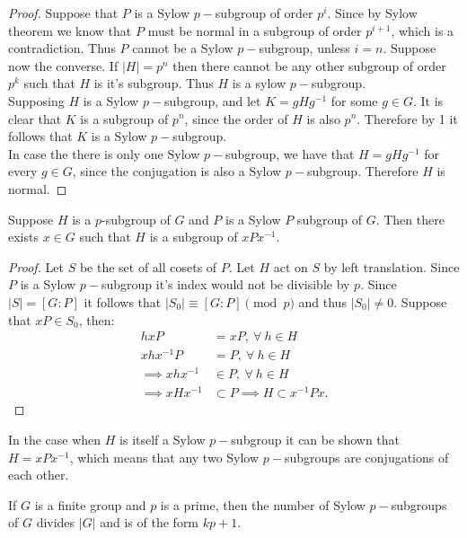 \begin{proof}
  Suppose that $P$ is a Sylow $p-$subgroup of order $p^i$. Since by Sylow theorem we know that $P$ must be normal in a subgroup of order $p^{i+1}$, which is a contradiction. Thus $P$ cannot be a Sylow $p-$subgroup, unless $i=n$. Suppose now the converse. If $|H| = p^n$ then there cannot be any other subgroup of order $p^k$ such that $H$ is it's subgroup. Thus $H$ is a sylow $p-$subgroup.\\

  Supposing $H$ is a Sylow $p-$subgroup, and let $K = gHg^{-1}$ for some $g\in G$. It is clear that $K$ is a subgroup of $p^n$, since the order of $H$ is also $p^n$. Therefore by 1 it follows that $K$ is a Sylow $p-$subgroup.\\

  In case the there is only one Sylow $p-$subgroup, we have that $H = gHg^{-1}$ for every $g\in G$, since the conjugation is also a Sylow $p-$subgroup. Therefore $H$ is normal.
\end{proof}
\begin{theorem}
  Suppose $H$ is a $p$-subgroup of $G$ and $P$ is a Sylow $P$ subgroup of $G$. Then there exists $x\in G$ such that $H$ is a subgroup of $xPx^{-1}$.
\end{theorem}
\begin{proof}
  Let $S$ be the set of all cosets of $P$. Let $H$ act on $S$ by left translation. Since $P$ is a Sylow $p-$subgroup it's index would not be divisible by $p$. Since $|S| = [G:P]$ it follows that $|S_0| \equiv [G:P] \pmod{p}$ and thus $|S_0| \neq 0$. Suppose that $xP \in S_0$, then:
  \begin{align*}
    hxP &= xP,\ \forall\ h\in H\\
    xhx^{-1}P &= P,\ \forall\ h\in H\\
    \implies xhx^{-1} &\in P,\ \forall\ h\in H\\
    \implies xHx^{-1} &\subset P \implies H\subset x^{-1}Px.
  \end{align*}
\end{proof}
\begin{remark}
  In the case when $H$ is itself a Sylow $p-$subgroup it can be shown that $H = xPx^{-1}$, which means that any two Sylow $p-$subgroups are conjugations of each other.
\end{remark}
\begin{theorem}
  If $G$ is a finite group and $p$ is a prime, then the number of Sylow $p-$subgroups of $G$ divides $|G|$ and is of the form $kp+1$. 
\end{theorem}
